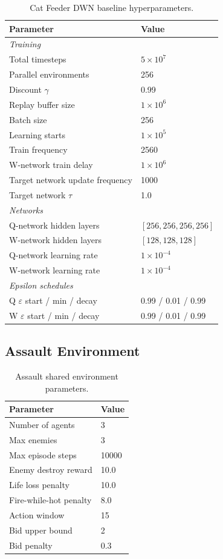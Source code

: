 \begin{table}[h]
\centering
\begin{tabular}{ll}
\toprule
Parameter & Value \\
\midrule
\multicolumn{2}{l}{\textit{Training}} \\
Total timesteps & $5 \times 10^{7}$ \\
Parallel environments & 256 \\
Discount $\gamma$ & 0.99 \\
Replay buffer size & $1 \times 10^{6}$ \\
Batch size & 256 \\
Learning starts & $1 \times 10^{5}$ \\
Train frequency & 2560 \\
W-network train delay & $1 \times 10^{6}$ \\
Target network update frequency & 1000 \\
Target network $\tau$ & 1.0 \\
\midrule
\multicolumn{2}{l}{\textit{Networks}} \\
Q-network hidden layers & $[256, 256, 256, 256]$ \\
W-network hidden layers & $[128, 128, 128]$ \\
Q-network learning rate & $1 \times 10^{-4}$ \\
W-network learning rate & $1 \times 10^{-4}$ \\
\midrule
\multicolumn{2}{l}{\textit{Epsilon schedules}} \\
Q $\varepsilon$ start / min / decay & 0.99 / 0.01 / 0.99 \\
W $\varepsilon$ start / min / decay & 0.99 / 0.01 / 0.99 \\
\bottomrule
\end{tabular}
\caption{Cat Feeder DWN baseline hyperparameters.}
\end{table}

\subsection{Assault Environment}

\begin{table}[h]
\centering
\begin{tabular}{ll}
\toprule
Parameter & Value \\
\midrule
Number of agents & 3 \\
Max enemies & 3 \\
Max episode steps & 10000 \\
Enemy destroy reward & 10.0 \\
Life loss penalty & 10.0 \\
Fire-while-hot penalty & 8.0 \\
Action window & 15 \\
Bid upper bound & 2 \\
Bid penalty & 0.3 \\
\bottomrule
\end{tabular}
\caption{Assault shared environment parameters.}
\end{table}

